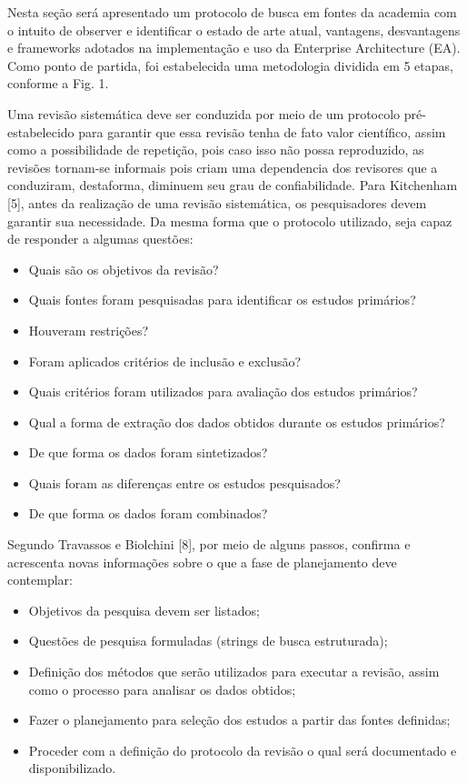 Nesta seção será apresentado um protocolo de busca em fontes da academia com o intuito de observer e identificar o estado de arte atual, vantagens, desvantagens e frameworks adotados na implementação e uso da Enterprise Architecture (EA). Como ponto de partida, foi estabelecida uma metodologia dividida em 5 etapas, conforme a Fig. 1.


Uma revisão sistemática deve ser conduzida por meio de um protocolo pré-estabelecido para garantir que essa revisão tenha de fato valor científico, assim como a possibilidade de repetição, pois caso isso não possa reproduzido, as revisões tornam-se informais pois criam uma dependencia dos revisores que a conduziram, destaforma, diminuem seu grau de confiabilidade.
Para Kitchenham [5], antes da realização de uma revisão sistemática, os pesquisadores devem garantir sua necessidade. Da mesma forma que o protocolo utilizado, seja capaz de responder a algumas questões:

\begin{itemize}
    \item Quais são os objetivos da revisão?
    \item Quais fontes foram pesquisadas para identificar os estudos primários? 
    \item Houveram restrições?
    \item Foram aplicados critérios de inclusão e exclusão?
    \item Quais critérios foram utilizados para avaliação dos estudos primários?
    \item Qual a forma de extração dos dados obtidos durante os estudos primários?
    \item De que forma os dados foram sintetizados?
    \item Quais foram as diferenças entre os estudos pesquisados?
    \item De que forma os dados foram combinados?
\end{itemize}

Segundo Travassos e Biolchini [8], por meio de alguns passos, confirma e acrescenta novas informações sobre o que a fase de planejamento deve contemplar:

\begin{itemize}
    \item Objetivos da pesquisa devem ser listados;
    \item Questões de pesquisa formuladas (strings de busca estruturada);
    \item Definição dos métodos que serão utilizados para executar a revisão, assim como o processo para analisar os dados obtidos;
    \item Fazer o planejamento para seleção dos estudos a partir das fontes definidas;
    \item Proceder com a definição do protocolo da revisão o qual será documentado e disponibilizado.
\end{itemize}


